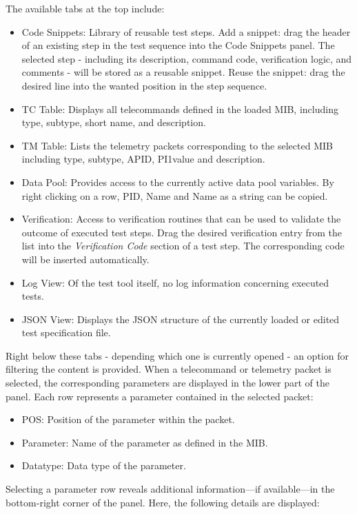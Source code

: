 The available tabs at the top include:

\begin{itemize}
\item Code Snippets: Library of reusable test steps. Add a snippet: drag the header of an existing step in the test sequence into the Code Snippets panel. The selected step - including its description, command code, verification logic, and comments - will be stored as a reusable snippet. Reuse the snippet: drag the desired line into the wanted position in the step sequence.
\item TC Table: Displays all telecommands defined in the loaded MIB, including type, subtype, short name, and description.
\item TM Table: Lists the telemetry packets corresponding to the selected MIB including type, subtype, APID, PI1value and description.
\item Data Pool: Provides access to the currently active data pool variables. By right clicking on a row, PID, Name and Name as a string can be copied.
\item Verification: Access to verification routines that can be used to validate the outcome of executed test steps. Drag the desired verification entry from the list into the \emph{Verification Code} section of a test step. The corresponding code will be inserted automatically.
\item Log View: Of the test tool itself, no log information concerning executed tests.
\item JSON View: Displays the JSON structure of the currently loaded or edited test specification file.
\end{itemize}

Right below these tabs - depending which one is currently opened - an option for filtering the content is provided. When a telecommand or telemetry packet is selected, the corresponding parameters are displayed in the lower part of the panel. Each row represents a parameter contained in the selected packet:

\begin{itemize}
\item POS: Position of the parameter within the packet.
\item Parameter: Name of the parameter as defined in the MIB.
\item Datatype: Data type of the parameter.
\end{itemize}

Selecting a parameter row reveals additional information—if available—in the bottom-right corner of the panel. Here, the following details are displayed:

